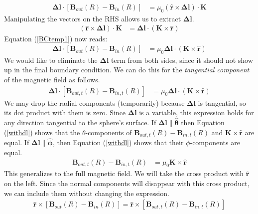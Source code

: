 \documentclass{article}
\begin{document}
\begin{align}
    \mathbf{\Delta l}\cdot[\mathbf{B}_{out}(R) - \mathbf{B}_{in}(R)] &= \mu_0 (\mathbf{\hat{r}}\times\mathbf{\Delta l})\cdot\mathbf{K} \label{BCtemp1}
\end{align}
Manipulating the vectors on the RHS allows us to extract $\mathbf{\Delta l}$.
\begin{align}
    (\mathbf{\hat{r}}\times\mathbf{\Delta l})\cdot\mathbf{K} &= \mathbf{\Delta l}\cdot(\mathbf{K}\times\mathbf{\hat{r}}) 
\end{align}
Equation (\ref{BCtemp1}) now reads:
\begin{align}
    \mathbf{\Delta l}\cdot[\mathbf{B}_{out}(R) - \mathbf{B}_{in}(R)] &= \mu_0\mathbf{\Delta l}\cdot(\mathbf{K}\times\mathbf{\hat{r}}) \label{BCtemp}
\end{align}
We would like to eliminate the $\mathbf{\Delta l}$ term from both sides, since it should not show up in the final boundary condition. We can do this for the \textit{tangential component} of the magnetic field as follows.
\begin{align}
    \mathbf{\Delta l}\cdot[\mathbf{B}_{out,t}(R) - \mathbf{B}_{in,t}(R)] &= \mu_0\mathbf{\Delta l}\cdot(\mathbf{K}\times\mathbf{\hat{r}}) \label{withdl}
\end{align}
We may drop the radial components (temporarily) because $\mathbf{\Delta l}$ is tangential, so its dot product with them is zero. Since $\mathbf{\Delta l}$ is a variable, this expression holds for any direction tangential to the sphere's surface. If $\mathbf{\Delta l}\parallel\boldsymbol{\hat{\theta}}$ then Equation (\ref{withdl}) shows that the $\theta$-components of $\mathbf{B}_{out,t}(R) - \mathbf{B}_{in,t}(R)$ and $\mathbf{K}\times\mathbf{\hat{r}}$ are equal. If $\mathbf{\Delta l}\parallel\boldsymbol{\hat{\phi}}$, then Equation (\ref{withdl}) shows that their $\phi$-components are equal.
\begin{align}
    \mathbf{B}_{out,t}(R) - \mathbf{B}_{in,t}(R) &= \mu_0\mathbf{K}\times\mathbf{\hat{r}} \label{tangentialbc}
\end{align}
This generalizes to the full magnetic field. We will take the cross product with $\mathbf{\hat{r}}$ on the left. Since the normal components will disappear with this cross product, we can include them without changing the expression. 
\begin{align}
    \mathbf{\hat{r}}\times [\mathbf{B}_{out}(R) - \mathbf{B}_{in}(R)] = \mathbf{\hat{r}}\times [\mathbf{B}_{out,t}(R) - \mathbf{B}_{in,t}(R)]
\end{align}
\end{document}
